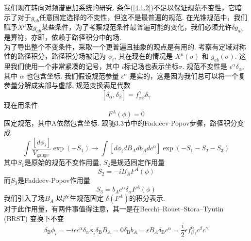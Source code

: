 我们现在转向对频谱更加系统的研究. 条件(\ref{4.1.2})不足以保证规范不变性，它暗示了对于$g_{ab}$任意固定选择的不变性，但这不是最普遍的规范. 在光锥规范中，我们赋予$X^\mu$及$g_{ab}$某些条件，为了考察规范条件最普遍可能的变化，我们必须允许$\delta g_{ab}$是算符，亦即，依赖于路径积分中的场.\\
为了导出整个不变条件，采取一个更普遍且抽象的观点是有用的. 考察有定域对称性的路径积分，路径积分场被记为 $\phi_{i}$, 其在现在的情况是 $X^{\mu}(\sigma)$ 和 $g_{a b}(\sigma) $. 这里我们使用一个非常紧凑的记号，其中 $i$标记场也表示坐标$\sigma $. 规范不变性是 $\epsilon^{\alpha} \delta_{\alpha}$, 其中 $\alpha$ 也包含坐标. 我们假设规范参量 $\epsilon^{\alpha}$ 是实的，这是因为我们总可以将一个复参量分解成实部与虚部. 规范变换满足代数
\begin{equation}\label{4.2.1}
\left[\delta_{\alpha}, \delta_{\beta}\right]=f_{\alpha \beta}^{\gamma} \delta_{\gamma}
\end{equation}
现在用条件
\begin{equation}
F^{A}(\phi)=0
\end{equation}
固定规范，其中A依然包含坐标. 跟随3.3节中的Faddeev-Popov步骤，路径积分变成
\begin{equation}
\int \frac{\left[d \phi_{i}\right]}{V_{\text {gauge }}} \exp \left(-S_{1}\right) \rightarrow \int\left[d \phi_{i} d B_{A} d b_{A} d c^{\alpha}\right] \exp \left(-S_{1}-S_{2}-S_{3}\right)
\end{equation}
其中$S_1$是原始的规范不变作用量, $S_2$是规范固定作用量
\begin{equation}
S_{2}=-i B_{A} F^{A}(\phi)
\end{equation}
而$S_3$是Faddeev-Popov作用量
\begin{equation}
S_{3}=b_{A} c^{\alpha} \delta_{\alpha} F^{A}(\phi)
\end{equation}
我们引入了场$B_A$ 以产生规范固定 $\delta\left(F^{A}\right)$的积分表示.\\
对于此作用量，有两件事值得注意，其一是在Becchi–Rouet–Stora–Tyutin (BRST) 变换下不变
\begin{subequations}\label{4.2.6}
\begin{equation}
\delta_{\mathrm{B}} \phi_{i}=-i \epsilon c^{\alpha} \delta_{\alpha} \phi_{i}
\end{equation}
\begin{equation}
\delta_{\mathrm{B}} B_{A}=0
\end{equation}
\begin{equation}
\delta_{\mathrm{B}} b_{A}=\epsilon B_{A}
\end{equation}
\begin{equation}
\delta_{\mathrm{B}} c^{\alpha}=\frac{i}{2} \epsilon f_{\beta \gamma}^{\alpha} c^{\beta} c^{\gamma}
\end{equation}
\end{subequations}
